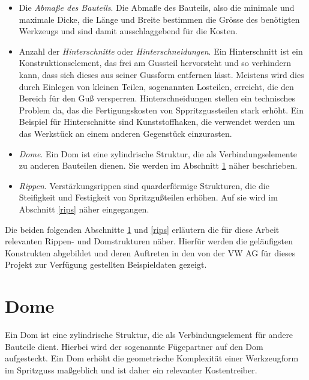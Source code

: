 \begin{itemize}
\item Die \textit{Abma{\ss}e des Bauteils}. Die Abma{\ss}e des Bauteils, also die minimale und maximale Dicke, die L\"ange und Breite bestimmen die Gr\"osse des ben\"otigten Werkzeugs und sind damit ausschlaggebend f\"ur die Kosten.

\item Anzahl der \textit{Hinterschnitte} oder \textit{Hinterschneidungen}. Ein Hinterschnitt ist ein Konstruktionselement, das frei am Gussteil hervorsteht und so verhindern kann, dass sich dieses aus seiner Gussform entfernen lässt. Meistens wird dies durch Einlegen von kleinen Teilen, sogenannten Losteilen, erreicht, die den Bereich für den Gu{\ss} versperren. Hinterschneidungen stellen ein technisches Problem da, das die Fertigungskosten von Sppritzgussteilen stark erh\"oht. Ein Beispiel f\"ur Hinterschnitte sind Kunststoffhaken, die verwendet werden um das Werkst\"uck an einem anderen Gegenstück einzurasten. 

\item \textit{Dome}. Ein Dom ist eine zylindrische Struktur, die als Verbindungselemente zu anderen Bauteilen dienen. Sie werden im Abschnitt \ref{sec:dome} n\"aher beschrieben.

\item \textit{Rippen}. Verst\"arkungsrippen sind quarderf\"ormige Strukturen, die die Steifigkeit und Festigkeit von Spritzgu{\ss}teilen erhöhen. Auf sie wird im Abschnitt \ref{rips} n\"aher eingegangen.

\end{itemize}

Die beiden folgenden Abschnitte \ref{sec:dome} und \ref{rips} erl\"autern die f\"ur diese Arbeit relevanten Rippen- und Domstrukturen n\"aher. Hierf\"ur werden die gel\"aufigsten Konstrukten abgebildet und deren Auftreten in den von der VW AG f\"ur dieses Projekt zur Verf\"ugung gestellten Beispieldaten gezeigt. 

\section{Dome}
\label{sec:dome}

Ein Dom ist eine zylindrische Struktur, die als Verbindungselement f\"ur andere Bauteile dient.  Hierbei wird der sogenannte F\"ugepartner auf den Dom aufgesteckt. Ein Dom erh\"oht die geometrische Komplexit\"at einer Werkzeugform im Spritzguss ma{\ss}geblich und ist daher ein relevanter Kostentreiber.


